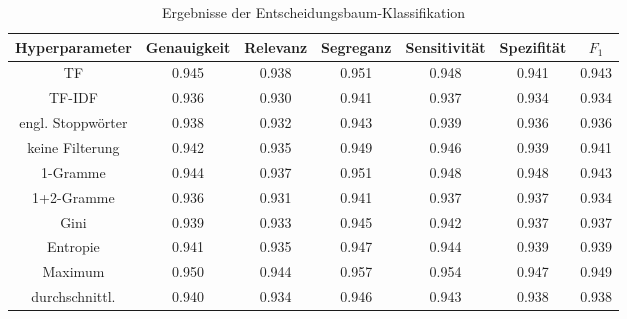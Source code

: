 \begin{table}[htb]
	\begin{center}
		\begin{tabular}{|c|c|c|c|c|c|c|}
			\hline 
			Hyperparameter & Genauigkeit & Relevanz & Segreganz & Sensitivität & Spezifität & $F_1$ \\ \hline \hline
			TF       & 0.945 & 0.938 & 0.951 & 0.948 & 0.941 & 0.943 \\ \hline
			TF-IDF   & 0.936 & 0.930 & 0.941 & 0.937 & 0.934 & 0.934 \\ \hline \hline
			engl. Stoppwörter & 0.938 & 0.932 & 0.943 & 0.939 & 0.936 & 0.936 \\ \hline
			keine Filterung    & 0.942 & 0.935 & 0.949 & 0.946 & 0.939 & 0.941 \\ \hline \hline
			1-Gramme   & 0.944 & 0.937 & 0.951 & 0.948 & 0.948 & 0.943 \\ \hline
			1+2-Gramme  & 0.936 & 0.931 & 0.941 & 0.937 & 0.937 & 0.934 \\ \hline \hline
			Gini & 0.939 & 0.933 & 0.945 & 0.942 & 0.937 & 0.937 \\ \hline
			Entropie & 0.941 & 0.935 & 0.947 & 0.944 & 0.939 & 0.939 \\ \hline
			\hline
			Maximum        & 0.950 & 0.944 & 0.957 & 0.954 & 0.947 & 0.949 \\ \hline
			durchschnittl. & 0.940 & 0.934 & 0.946 & 0.943 & 0.938 & 0.938 \\ \hline
		\end{tabular}
		\caption{Ergebnisse der Entscheidungsbaum-Klassifikation}\label{results-tree}
	\end{center}
\end{table}\\
